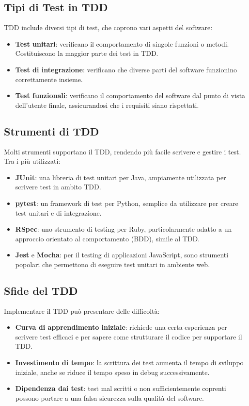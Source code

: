 \documentclass{article}
\begin{document}
\subsection{Tipi di Test in TDD}
TDD include diversi tipi di test, che coprono vari aspetti del software:
\begin{itemize}
    \item \textbf{Test unitari}: verificano il comportamento di singole funzioni o metodi. Costituiscono la maggior parte dei test in TDD.
    \item \textbf{Test di integrazione}: verificano che diverse parti del software funzionino correttamente insieme.
    \item \textbf{Test funzionali}: verificano il comportamento del software dal punto di vista dell'utente finale, assicurandosi che i requisiti siano rispettati.
\end{itemize}

\subsection{Strumenti di TDD}
Molti strumenti supportano il TDD, rendendo più facile scrivere e gestire i test. Tra i più utilizzati:
\begin{itemize}
    \item \textbf{JUnit}: una libreria di test unitari per Java, ampiamente utilizzata per scrivere test in ambito TDD.
    \item \textbf{pytest}: un framework di test per Python, semplice da utilizzare per creare test unitari e di integrazione.
    \item \textbf{RSpec}: uno strumento di testing per Ruby, particolarmente adatto a un approccio orientato al comportamento (BDD), simile al TDD.
    \item \textbf{Jest} e \textbf{Mocha}: per il testing di applicazioni JavaScript, sono strumenti popolari che permettono di eseguire test unitari in ambiente web.
\end{itemize}

\subsection{Sfide del TDD}
Implementare il TDD può presentare delle difficoltà:
\begin{itemize}
    \item \textbf{Curva di apprendimento iniziale}: richiede una certa esperienza per scrivere test efficaci e per sapere come strutturare il codice per supportare il TDD.
    \item \textbf{Investimento di tempo}: la scrittura dei test aumenta il tempo di sviluppo iniziale, anche se riduce il tempo speso in debug successivamente.
    \item \textbf{Dipendenza dai test}: test mal scritti o non sufficientemente coprenti possono portare a una falsa sicurezza sulla qualità del software.
\end{itemize}
\end{document}

